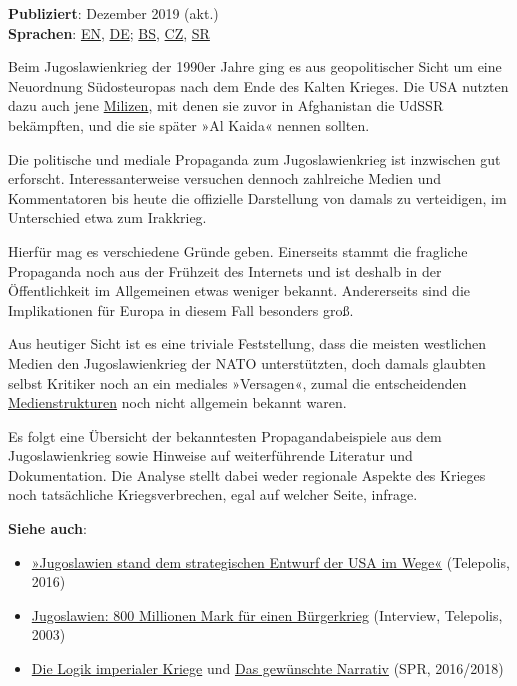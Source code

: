 \textbf{Publiziert}: Dezember 2019 (akt.)\\
\textbf{Sprachen}:
\href{https://swprs.org/propaganda-in-the-war-on-yugoslavia/}{EN},
\href{https://swprs.org/propaganda-im-jugoslawienkrieg/}{DE};
\href{https://mondo.ba/Info/Region/a923284/Trnopolje-Markale-Srebrenica-Racak-Podvale-oo-kojima-bruji-svijet.html}{BS},
\href{https://prima.iprima.cz/zpravodajstvi/svycari-o-valce-v-byvale-jugoslavii-dezinformacich-a-fake-news-medii-boju-se-ucastnila}{CZ},
\href{http://www.politika.rs/sr/clanak/444725/Na-Zapadu-se-urusava-mit-o-zlim-Srbima}{SR}

Beim Jugoslawienkrieg der 1990er Jahre ging es aus geopolitischer Sicht
um eine Neuordnung Süd­ost­europas nach dem Ende des Kalten Krieges. Die
USA nutzten dazu auch jene
\href{https://www.theguardian.com/world/2002/apr/22/warcrimes.comment}{Milizen},
mit denen sie zuvor in Afghanistan die UdSSR bekämpften, und die sie
später »Al Kaida« nennen sollten.

Die politische und mediale Propaganda zum Jugoslawien­krieg ist
inzwischen gut erforscht. Interes­santer­weise versuchen dennoch
zahlreiche Medien und Kommentatoren bis heute die offizielle Darstellung
von damals zu verteidigen, im Unterschied etwa zum Irak­krieg.

Hierfür mag es verschiedene Gründe geben. Einerseits stammt die
fragliche Propaganda noch aus der Frühzeit des Internets und ist deshalb
in der Öffentlichkeit im Allgemeinen etwas weniger bekannt. Andererseits
sind die Implikationen für Europa in diesem Fall besonders groß.

Aus heutiger Sicht ist es eine triviale Feststellung, dass die meisten
westlichen Medien den Jugo­sla­wien­krieg der NATO unterstützten, doch
damals glaubten selbst Kritiker noch an ein mediales »Versagen«, zumal
die entscheidenden
\href{https://swprs.org/netzwerk-medien-deutschland/}{Medienstrukturen}
noch nicht allgemein bekannt waren.

Es folgt eine Übersicht der bekanntesten Propagandabeispiele aus dem
Jugoslawienkrieg sowie Hinweise auf weiterführende Literatur und
Dokumentation. Die Analyse stellt dabei weder regionale Aspekte des
Krieges noch tatsächliche Kriegsverbrechen, egal auf welcher Seite,
infrage.

\textbf{Siehe auch}:

\begin{itemize}
\tightlist
\item
  \href{https://www.heise.de/tp/features/Der-Staat-Jugoslawien-stand-dem-strategischen-Entwurf-der-USA-im-Wege-3378506.html}{»Jugoslawien
  stand dem strategischen Entwurf der USA im Wege«} (Telepolis, 2016)
\item
  \href{https://www.heise.de/tp/features/800-Millionen-Mark-fuer-einen-Buergerkrieg-3430677.html}{Jugoslawien:
  800 Millionen Mark für einen Bürgerkrieg} (Interview, Telepolis, 2003)
\item
  \href{https://swprs.org/logik-imperialer-kriege/}{Die Logik imperialer
  Kriege} und \href{https://swprs.org/das-gewuenschte-narrativ/}{Das
  gewünschte Narrativ} (SPR, 2016/2018)
\end{itemize}

